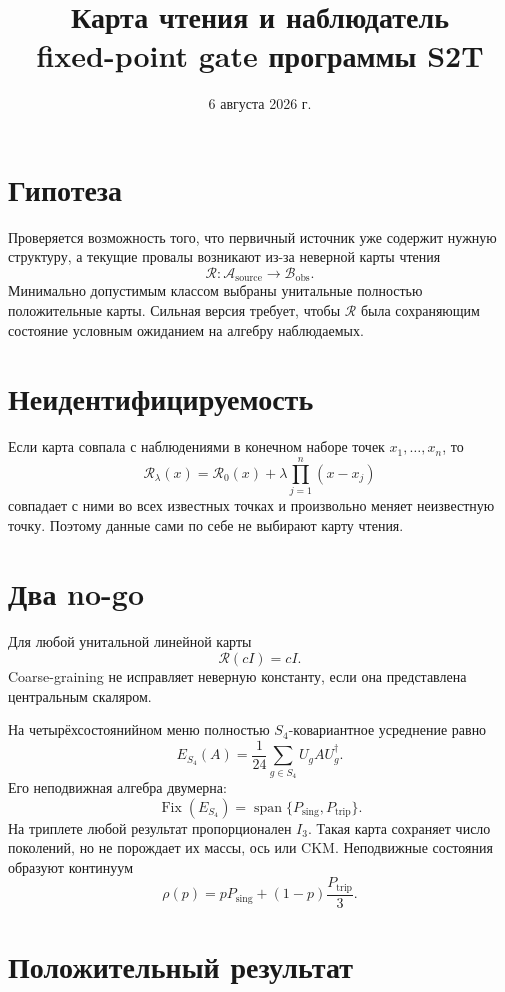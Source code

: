 \documentclass[12pt,a4paper]{article}
\title{Карта чтения и наблюдатель\\
fixed-point gate программы S2T}
\author{}
\date{6 августа 2026 г.}
\begin{document}
\maketitle

\section{Гипотеза}

Проверяется возможность того, что первичный источник уже содержит нужную
структуру, а текущие провалы возникают из-за неверной карты чтения
\[
 \mathcal R:\mathcal A_{\mathrm{source}}\longrightarrow
 \mathcal B_{\mathrm{obs}}.
\]
Минимально допустимым классом выбраны унитальные полностью положительные
карты. Сильная версия требует, чтобы \(\mathcal R\) была сохраняющим состояние
условным ожиданием на алгебру наблюдаемых.

\section{Неидентифицируемость}

Если карта совпала с наблюдениями в конечном наборе точек
\(x_1,\ldots,x_n\), то
\[
 \mathcal R_\lambda(x)=\mathcal R_0(x)
 +\lambda\prod_{j=1}^{n}(x-x_j)
\]
совпадает с ними во всех известных точках и произвольно меняет неизвестную
точку. Поэтому данные сами по себе не выбирают карту чтения.

\section{Два no-go}

Для любой унитальной линейной карты
\[
 \mathcal R(cI)=cI.
\]
Coarse-graining не исправляет неверную константу, если она представлена
центральным скаляром.

На четырёхсостоянийном меню полностью \(S_4\)-ковариантное усреднение равно
\[
 E_{S_4}(A)=\frac1{24}\sum_{g\in S_4}U_gAU_g^\dagger.
\]
Его неподвижная алгебра двумерна:
\[
 \operatorname{Fix}(E_{S_4})
 =\operatorname{span}\{P_{\mathrm{sing}},P_{\mathrm{trip}}\}.
\]
На триплете любой результат пропорционален \(I_3\). Такая карта сохраняет
число поколений, но не порождает их массы, ось или CKM. Неподвижные состояния
образуют континуум
\[
 \rho(p)=pP_{\mathrm{sing}}
 +(1-p)\frac{P_{\mathrm{trip}}}{3}.
\]

\section{Положительный результат}
\end{document}
